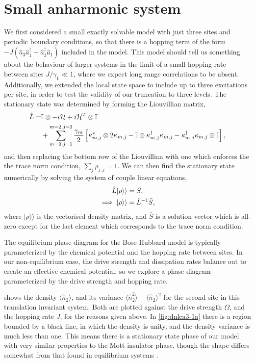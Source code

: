 \section{Small anharmonic system}

We first considered a small exactly solvable model with just three sites and periodic boundary conditions, so that there is a hopping term of the form \(-J(\hat{a}_{3}\hat{a}_{1}^{\dagger} + \hat{a}_{3}^{\dagger}\hat{a}_{1})\) included in the model. This model should tell us something about the behaviour of larger systems in the limit of a small hopping rate between sites \(J / \gamma_{1} \ll 1\), where we expect long range correlations to be absent. Additionally, we extended the local state space to include up to three excitations per site, in order to test the validity of our truncation to three levels. The stationary state was determined by forming the Liouvillian matrix,
\begin{align}
	\hat{L} = &\mathbb{I} \otimes -i\mathcal{H} + i\mathcal{H}^{T} \otimes \mathbb{I} \notag \\ 
	&+ \sum_{m=0,j=1}^{m=2,j=3}\frac{\gamma_{m}}{2}\left[ \kappa_{m,j}^{*} \otimes 2\kappa_{m,j} - \mathbb{I} \otimes \kappa_{m,j}^{\dagger}\kappa_{m,j} - \kappa_{m,j}^{\dagger}\kappa_{m,j} \otimes \mathbb{I}\right],
	\label{eq:dnlca3-1}
\end{align}
and then replacing the bottom row of the Liouvillian with one which enforces the the trace norm condition, \(\sum_{j} \rho_{j,j} = 1\). We can then find the stationary state numerically by solving the system of couple linear equations,
\begin{align}
	 \hat{L}|\rho \rangle \rangle &= \bar{S}, \notag \\
	 \implies |\rho \rangle \rangle &= \hat{L}^{-1}\bar{S},
	 \label{eq:dnlca3-2}
\end{align}
where \(|\rho\rangle\rangle\) is the vectorised density matrix, and \(\bar{S}\) is a solution vector which is all-zero except for the last element which corresponds to the trace norm condition.

The equilibrium phase diagram for the Bose-Hubbard model is typically parameterized by the chemical potential and the hopping rate between sites. In our non-equilibrium case, the drive strength and dissipation rates balance out to create an effective chemical potential, so we explore a phase diagram parameterized by the drive strength and hopping rate. 

 shows the density \(\langle \hat{n}_{2} \rangle\), and its variance \(\langle \hat{n}_{2}^{2} \rangle - \langle \hat{n}_{2} \rangle^{2}\) for the second site in this translation invariant system. Both are plotted against the drive strength \(\Omega\), and the hopping rate \(J\), for the reasons given above. In \cref{fig:dnlca3-1a} there is a region bounded by a black line, in which the density is unity, and the density variance is much less than one. This means there is a stationary state phase of our model with very similar properties to the Mott insulator phase, though the shape differs somewhat from that found in equilibrium systems \cite{Rossini2007}.

